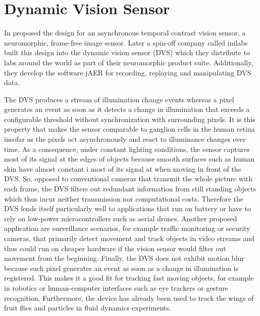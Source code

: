 \chapter{Dynamic Vision Sensor}
\label{cha:dvs}

In \citeyear{dvs} \citeauthor{dvs} proposed the design for an asynchronous
temporal contrast vision sensor, a neuromorphic, frame-free image sensor. Later
a spin-off company called inilabs built this design into the dynamic vision
sensor (DVS) which they distribute to labs around the world as part of their
neuromorphic product suite. Additionally, they develop the software jAER for
recording, replaying and manipulating DVS data.

The DVS produces a stream of illumination change events whereas a pixel
generates an event as soon as it detects a change in illumination that exceeds a
configurable threshold without synchronization with surrounding pixels. It is
this property that makes the sensor comparable to ganglion cells in the human
retina insofar as the pixels act asynchronously and react to illuminance changes
over time. As a consequence, under constant lighting conditions, the sensor
captures most of its signal at the edges of objects because smooth surfaces such
as human skin have almost constant i most of its signal at when moving in front
of the DVS. So, opposed to conventional cameras that transmit the whole picture
with each frame, the DVS filters out redundant information from still standing
objects which thus incur neither transmission nor computational costs. Therefore
the DVS lends itself particularly well to applications that run on battery or
have to rely on low-power microcontrollers such as aerial drones. Another
proposed application are surveillance scenarios, for example traffic monitoring
or security cameras, that primarily detect movement and track objects in video
streams and thus could run on cheaper hardware if the vision sensor would filter
out movement from the beginning. Finally, the DVS does not exhibit motion blur
because each pixel generates an event as soon as a change in illumination is
registered. This makes it a good fit for tracking fast moving objects, for
example in robotics or human-computer interfaces such as eye trackers or gesture
recognition. Furthermore, the device has already been used to track the wings of
fruit flies and particles in fluid dynamics experiments.

